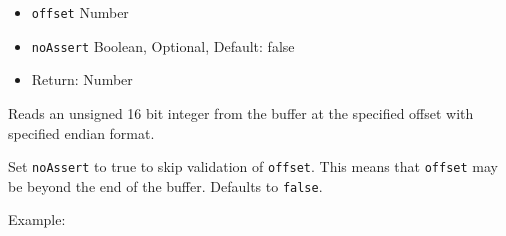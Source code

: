 \begin{itemize}
\itemsep1pt\parskip0pt
\item
  \texttt{offset} Number
\item
  \texttt{noAssert} Boolean, Optional, Default: false
\item
  Return: Number
\end{itemize}

Reads an unsigned 16 bit integer from the buffer at the specified offset
with specified endian format.

Set \texttt{noAssert} to true to skip validation of \texttt{offset}.
This means that \texttt{offset} may be beyond the end of the buffer.
Defaults to \texttt{false}.

Example:

\begin{Shaded}
\begin{Highlighting}[]
  \NormalTok{(}\NormalTok{);}

\NormalTok{buf[}\NormalTok{] = }\NormalTok{;}
\NormalTok{buf[}\NormalTok{] = }\NormalTok{;}
\NormalTok{buf[}\NormalTok{] = }\NormalTok{;}
\NormalTok{buf[}\NormalTok{] = }\NormalTok{;}

\NormalTok{(}\NormalTok{(}\NormalTok{));}
\NormalTok{(}\NormalTok{(}\NormalTok{));}
\NormalTok{(}\NormalTok{(}\NormalTok{));}
\NormalTok{(}\NormalTok{(}\NormalTok{));}
\NormalTok{(}\NormalTok{(}\NormalTok{));}
\NormalTok{(}\NormalTok{(}\NormalTok{));}

\end{Highlighting}
\end{Shaded}

